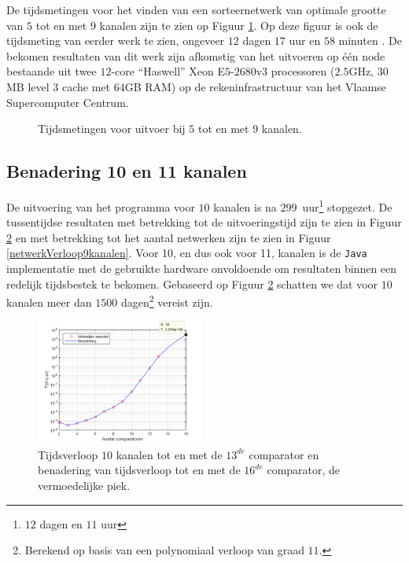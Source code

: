 \documentclass{article}
\begin{document}
De tijdsmetingen voor het vinden van een sorteernetwerk van optimale grootte van $5$ tot en met $9$ kanalen zijn te zien op Figuur \ref{Tijdsresultaten}.
Op deze figuur is ook de tijdsmeting van eerder werk te zien, ongeveer $12$ dagen $17$ uur en $58$ minuten \cite{sortingNetworksSize2014}.
De bekomen resultaten van dit werk zijn afkomstig van het uitvoeren op \'e\'en node bestaande uit twee $12$-core ``Haswell'' Xeon E$5$-$2680$v$3$ processoren ($2.5$GHz, $30$MB level $3$ cache met $64$GB RAM) op de rekeninfrastructuur van het Vlaamse Supercomputer Centrum.
\begin{figure}[!h]
\centering
{}
\caption{Tijdsmetingen voor uitvoer bij $5$ tot en met $9$ kanalen.}
\label{Tijdsresultaten}
\end{figure}

\subsection{Benadering 10 en 11 kanalen}
De uitvoering van het programma voor $10$ kanalen is na $299$~uur\footnote{$12$ dagen en $11$ uur} stopgezet.
De tussentijdse resultaten met betrekking tot de uitvoeringstijd zijn te zien in Figuur \ref{tijdverloop10kanalen} en met betrekking tot het aantal netwerken zijn te zien in Figuur \ref{netwerkVerloop9kanalen}.
Voor 10, en dus ook voor 11, kanalen is de \texttt{Java} implementatie met de gebruikte hardware onvoldoende om resultaten binnen een redelijk tijdsbestek te bekomen.
Gebaseerd op Figuur \ref{tijdverloop10kanalen} schatten we dat voor $10$ kanalen meer dan $1500$ dagen\footnote{Berekend op basis van een polynomiaal verloop van graad $11$.} vereist zijn. 
\begin{figure}[!h]
\centering
\includegraphics[width = 0.49\textwidth]{Benadering10_paper.png}
\caption{Tijdsverloop $10$ kanalen tot en met de  $13^{de}$ comparator en benadering van tijdsverloop tot en met de $16^{de}$ comparator, de vermoedelijke piek.}
\label{tijdverloop10kanalen}
\end{figure}
\end{document}
